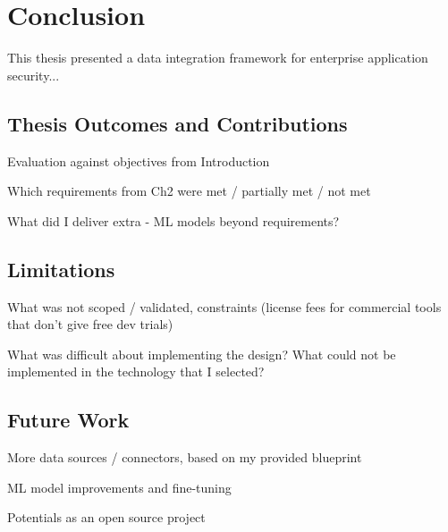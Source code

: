 \chapter*{Conclusion}
\label{ch:conclusion}

This thesis presented a data integration framework for enterprise application security...

\section*{Thesis Outcomes and Contributions}

Evaluation against objectives from Introduction

Which requirements from Ch2 were met / partially met / not met

What did I deliver extra - ML models beyond requirements?

\section*{Limitations}

What was not scoped / validated, constraints (license fees for commercial tools that don't give free dev trials)

What was difficult about implementing the design? What could not be implemented in the technology that I selected?

\section*{Future Work}

More data sources / connectors, based on my provided blueprint

ML model improvements and fine-tuning

Potentials as an open source project